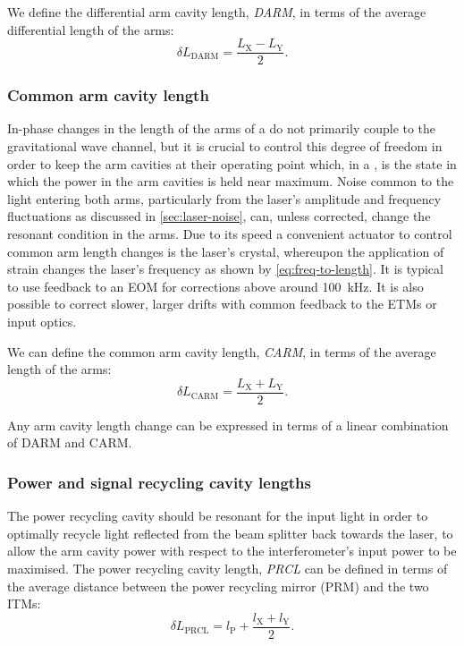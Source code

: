 We define the differential arm cavity length, \emph{\gls{DARM}}, in terms of the average differential length of the arms:
\begin{equation}
  \label{eq:darm-length}
  \delta L_{\text{DARM}} = \frac{L_{\text{X}} - L_{\text{Y}}}{2}.
\end{equation}

\subsubsection{Common arm cavity length}
In-phase changes in the length of the arms of a \MI{} do not primarily couple to the gravitational wave channel, but it is crucial to control this degree of freedom in order to keep the arm cavities at their operating point which, in a \DRFPMI{}, is the state in which the power in the arm cavities is held near maximum. Noise common to the light entering both arms, particularly from the laser's amplitude and frequency fluctuations as discussed in \cref{sec:laser-noise}, can, unless corrected, change the resonant condition in the arms. Due to its speed a convenient actuator to control common arm length changes is the laser's crystal, whereupon the application of strain changes the laser's frequency as shown by \cref{eq:freq-to-length}. It is typical to use feedback to an \gls{EOM} for corrections above around \SI{100}{\kilo\hertz}. It is also possible to correct slower, larger drifts with common feedback to the \glspl{ETM} or input optics.

We can define the common arm cavity length, \emph{\gls{CARM}}, in terms of the average length of the arms:
\begin{equation}
  \delta L_{\text{CARM}} = \frac{L_{\text{X}} + L_{\text{Y}}}{2}.
\end{equation}

Any arm cavity length change can be expressed in terms of a linear combination of \gls{DARM} and \gls{CARM}.

\subsubsection{Power and signal recycling cavity lengths}
The power recycling cavity should be resonant for the input light in order to optimally recycle light reflected from the beam splitter back towards the laser, to allow the arm cavity power with respect to the interferometer's input power to be maximised. The power recycling cavity length, \emph{\gls{PRCL}} can be defined in terms of the average distance between the power recycling mirror (\gls{PRM}) and the two \glspl{ITM}:
\begin{equation}
  \label{eq:prcl-length}
  \delta L_{\text{PRCL}} = l_{\text{P}} + \frac{l_{\text{X}} + l_{\text{Y}}}{2}.
\end{equation}

